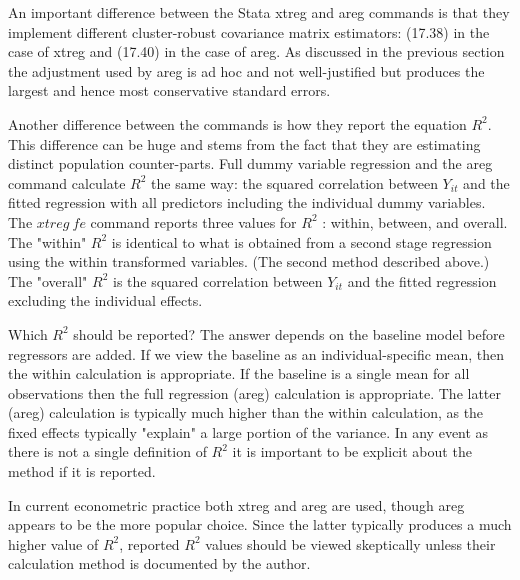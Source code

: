 \documentclass[10pt]{article}
\begin{document}
An important difference between the Stata xtreg and areg commands is that they implement different cluster-robust covariance matrix estimators: (17.38) in the case of xtreg and (17.40) in the case of areg. As discussed in the previous section the adjustment used by areg is ad hoc and not well-justified but produces the largest and hence most conservative standard errors.

Another difference between the commands is how they report the equation $R^{2}$. This difference can be huge and stems from the fact that they are estimating distinct population counter-parts. Full dummy variable regression and the areg command calculate $R^{2}$ the same way: the squared correlation between $Y_{i t}$ and the fitted regression with all predictors including the individual dummy variables. The $x t r e g ~ f e$ command reports three values for $R^{2}$ : within, between, and overall. The "within" $R^{2}$ is identical to what is obtained from a second stage regression using the within transformed variables. (The second method described above.) The "overall" $R^{2}$ is the squared correlation between $Y_{i t}$ and the fitted regression excluding the individual effects.

Which $R^{2}$ should be reported? The answer depends on the baseline model before regressors are added. If we view the baseline as an individual-specific mean, then the within calculation is appropriate. If the baseline is a single mean for all observations then the full regression (areg) calculation is appropriate. The latter (areg) calculation is typically much higher than the within calculation, as the fixed effects typically "explain" a large portion of the variance. In any event as there is not a single definition of $R^{2}$ it is important to be explicit about the method if it is reported.

In current econometric practice both xtreg and areg are used, though areg appears to be the more popular choice. Since the latter typically produces a much higher value of $R^{2}$, reported $R^{2}$ values should be viewed skeptically unless their calculation method is documented by the author.
\end{document}
